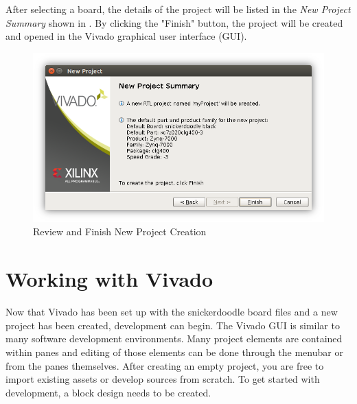 \noindent
After selecting a board, the details of the project will be listed in the \textit{New Project Summary} shown in . By clicking the "Finish" button, the project will be created and opened in the Vivado graphical user interface (GUI). \\

\begin{figure}
	\centering
	\includegraphics{images/Finish_New_Project.png}
	\caption{Review and Finish New Project Creation}
	\label{fig:vivadoprojectfinish}
\end{figure}


\section{Working with Vivado}

Now that Vivado has been set up with the snickerdoodle board files and a new project has been created, development can begin. The Vivado GUI is similar to many software development environments. Many project elements are contained within panes and editing of those elements can be done through the menubar or from the panes themselves. After creating an empty project, you are free to import existing assets or develop sources from scratch. To get started with development, a block design needs to be created.


